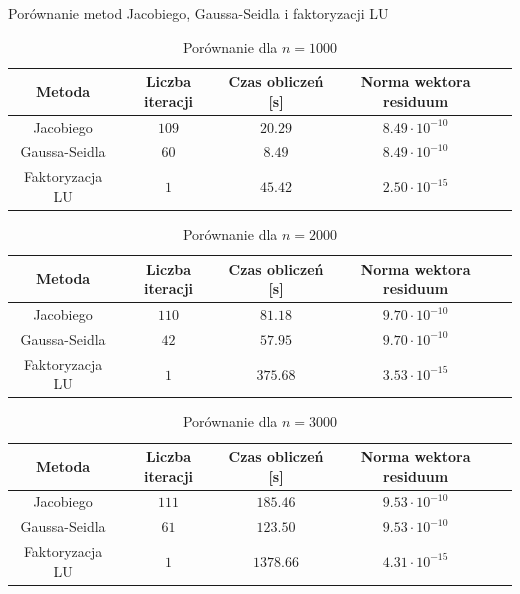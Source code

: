 \documentclass{article}
\begin{document}
\begin{section}{Porównanie metod Jacobiego, Gaussa-Seidla i faktoryzacji LU}
    \begin{table}
        \centering
        \begin{tabular}{|c|c|c|c|c|}
            \hline
            Metoda & Liczba iteracji & Czas obliczeń [s] & Norma wektora residuum \\
            \hline
            Jacobiego & $109$ & $20.29$ & $8.49\cdot10^{-10}$ \\
            Gaussa-Seidla & $60$ & $8.49$ & $8.49\cdot10^{-10}$ \\
            Faktoryzacja LU & $1$ & $45.42$ & $2.50\cdot10^{-15}$ \\
            \hline
        \end{tabular}
        \caption{Porównanie dla $n = 1000$}
    \end{table}

    \begin{table}
        \centering
        \begin{tabular}{|c|c|c|c|c|}
            \hline
            Metoda & Liczba iteracji & Czas obliczeń [s] & Norma wektora residuum \\
            \hline
            Jacobiego & $110$ & $81.18$ & $9.70\cdot10^{-10}$ \\
            Gaussa-Seidla & $42$ & $57.95$ & $9.70\cdot10^{-10}$ \\
            Faktoryzacja LU & $1$ & $375.68$ & $3.53\cdot10^{-15}$ \\
            \hline
        \end{tabular}
        \caption{Porównanie dla $n = 2000$}
    \end{table}

    \begin{table}
        \centering
        \begin{tabular}{|c|c|c|c|c|}
            \hline
            Metoda & Liczba iteracji & Czas obliczeń [s] & Norma wektora residuum \\
            \hline
            Jacobiego & $111$ & $185.46$ & $9.53\cdot10^{-10}$ \\
            Gaussa-Seidla & $61$ & $123.50$ & $9.53\cdot10^{-10}$ \\
            Faktoryzacja LU & $1$ & $1378.66$ & $4.31\cdot10^{-15}$ \\
            \hline
        \end{tabular}
        \caption{Porównanie dla $n = 3000$}
    \end{table}


\end{section}
\end{document}
